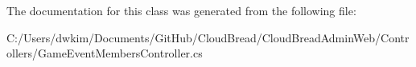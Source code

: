 The documentation for this class was generated from the following file\+:\begin{DoxyCompactItemize}
\item 
C\+:/\+Users/dwkim/\+Documents/\+Git\+Hub/\+Cloud\+Bread/\+Cloud\+Bread\+Admin\+Web/\+Controllers/Game\+Event\+Members\+Controller.\+cs\end{DoxyCompactItemize}
